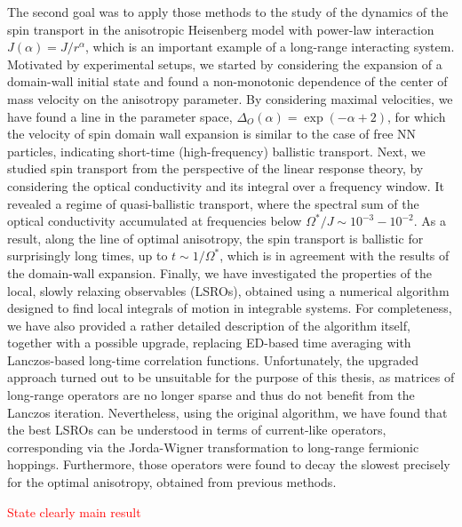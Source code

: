 The second goal was to apply those methods to the study of the dynamics of the spin transport in the anisotropic
Heisenberg model with power-law interaction \(J(\alpha) = J/r^{\alpha}\), which is an important example of a
long-range interacting system. Motivated by experimental setups, we started by considering the
expansion of a domain-wall initial state and found a non-monotonic dependence of the
center of mass velocity on the anisotropy parameter. By considering maximal velocities,
we have found a line in the parameter space, \(\Delta_O(\alpha) = \exp(-\alpha + 2)\),
for which the velocity of spin domain wall expansion is similar to the case of free
NN particles, indicating short-time (high-frequency) ballistic transport. 
Next, we studied spin transport from the perspective of the linear response theory,
by considering the optical conductivity and its integral over a frequency window. 
It revealed a regime of quasi-ballistic transport, where the spectral sum
of the optical conductivity accumulated at frequencies below \(\Omega^{\ast}/J \sim
10^{-3}-10^{-2}\). As a result, along the line of optimal anisotropy, the spin
transport is ballistic for surprisingly long times, up to \(t \sim 1/\Omega^{\ast}\),
which is in agreement with the results of the domain-wall expansion. 
Finally, we have investigated the properties of the local, slowly relaxing observables
(LSROs), obtained using a numerical algorithm designed to find local integrals of
motion in integrable systems. For completeness, we have also provided a rather detailed
description of the algorithm itself, together with a possible upgrade, replacing
ED-based time averaging with Lanczos-based long-time correlation functions.
Unfortunately, the upgraded approach turned out to be unsuitable for the purpose of
this thesis, as matrices of long-range operators are no longer sparse and thus do not
benefit from the Lanczos iteration. Nevertheless, using the original algorithm, we
have found that the best LSROs can be understood in terms of
current-like operators, corresponding via the Jorda-Wigner
transformation to long-range fermionic hoppings. Furthermore, those operators were
found to decay the slowest precisely for the optimal anisotropy, obtained from
previous methods. 

\textcolor{red}{State clearly main result}


